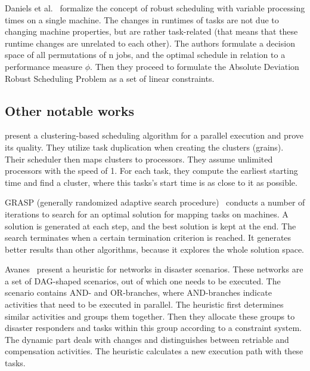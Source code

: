 \documentclass[conference]{IEEEtran}
\begin{document}
    Daniels et al.~\cite{daniels1995robust} formalize the concept of robust scheduling with variable processing times
    on a single machine.
    The changes in runtimes of tasks are not due to changing machine properties, but are rather task-related (that means
    that these runtime changes are unrelated to each other).
    The authors formulate a decision space of all permutations of n jobs, and the optimal schedule in relation to a
    performance measure $\phi$.
    Then they proceed to formulate the Absolute Deviation Robust Scheduling Problem as a set of linear constraints.

    \subsection{Other notable works}

    \cite{palis1996task} present a clustering-based scheduling algorithm for a parallel execution and prove its quality.
    They utilize task duplication when creating the clusters (grains).
    Their scheduler then maps clusters to processors.
    They assume unlimited processors with the speed of 1.
    For each task, they compute the earliest starting time and find a cluster, where this tasks's start time is as close
    to it as possible.

    GRASP (generally randomized adaptive search procedure)~\cite{feo1989probabilistic} conducts a number of iterations
    to search for an optimal solution for mapping tasks on machines.
    A solution is generated at each step, and the best solution is kept at the end.
    The search terminates when a certain termination criterion is reached.
    It generates better results than other algorithms, because it explores the whole solution space.

    Avanes~\etal\cite{avanes2008adaptive} present a heuristic for networks in disaster scenarios.
    These networks are a set of DAG-shaped scenarios, out of which one needs to be executed.
    The scenario contains AND- and OR-branches, where AND-branches indicate activities that need to be executed in parallel.
    The heuristic first determines similar activities and groups them together.
    Then they allocate these groups to disaster responders and tasks within this group according to a constraint system.
    The dynamic part deals with changes and distinguishes between retriable and compensation activities.
    The heuristic calculates a new execution path with these tasks.
\end{document}
